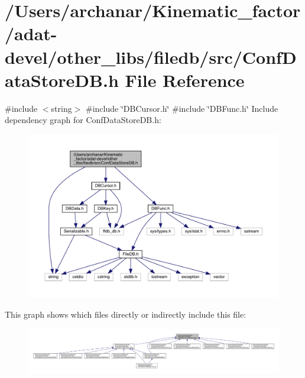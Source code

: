\hypertarget{adat-devel_2other__libs_2filedb_2src_2ConfDataStoreDB_8h}{}\section{/\+Users/archanar/\+Kinematic\+\_\+factor/adat-\/devel/other\+\_\+libs/filedb/src/\+Conf\+Data\+Store\+DB.h File Reference}
\label{adat-devel_2other__libs_2filedb_2src_2ConfDataStoreDB_8h}
{\ttfamily \#include $<$string$>$}\newline
{\ttfamily \#include \char`\"{}D\+B\+Cursor.\+h\char`\"{}}\newline
{\ttfamily \#include \char`\"{}D\+B\+Func.\+h\char`\"{}}\newline
Include dependency graph for Conf\+Data\+Store\+D\+B.\+h\+:
\nopagebreak
\begin{figure}[H]
\begin{center}
\leavevmode
\includegraphics[width=350pt]{d2/dc2/adat-devel_2other__libs_2filedb_2src_2ConfDataStoreDB_8h__incl}
\end{center}
\end{figure}
This graph shows which files directly or indirectly include this file\+:
\nopagebreak
\begin{figure}[H]
\begin{center}
\leavevmode
\includegraphics[width=350pt]{d9/d9f/adat-devel_2other__libs_2filedb_2src_2ConfDataStoreDB_8h__dep__incl}
\end{center}
\end{figure}
